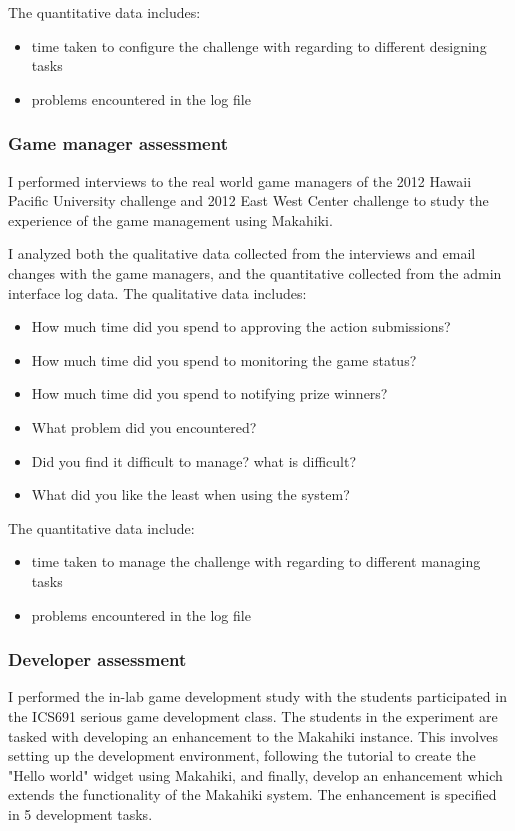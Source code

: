 The quantitative data includes:
\begin{itemize}
 \item time taken to configure the challenge with regarding to different designing tasks
 \item problems encountered in the log file
\end{itemize}

\subsubsection{Game manager assessment}
I performed interviews to the real world game managers of the 2012 Hawaii Pacific University challenge and 2012 East West Center challenge to study the experience of the game management using Makahiki.

I analyzed both the qualitative data collected from the interviews and email changes with the game managers, and the quantitative collected from the admin interface log data. The qualitative data includes:
\begin{itemize}
\item How much time did you spend to approving the action submissions?
\item How much time did you spend to monitoring the game status?
\item How much time did you spend to notifying prize winners?
\item What problem did you encountered?
\item Did you find it difficult to manage? what is difficult?
\item What did you like the least when using the system?
\end{itemize}

The quantitative data include:
\begin{itemize}
 \item time taken to manage the challenge with regarding to different managing tasks
 \item problems encountered in the log file
\end{itemize}

\subsubsection{Developer assessment}

I performed the in-lab game development study with the students participated in the ICS691 serious game development class. The students in the experiment are tasked with developing an enhancement to the Makahiki instance. This involves setting up the development environment, following the tutorial to create the "Hello world" widget using Makahiki, and finally, develop an enhancement which extends the functionality of the Makahiki system. The enhancement is specified in 5 development tasks. 

